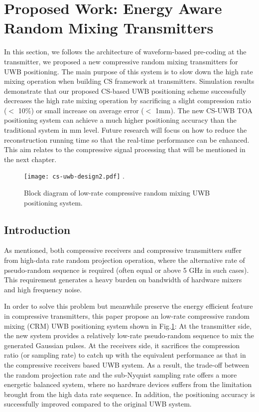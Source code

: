 \section{Proposed Work: Energy Aware Random Mixing Transmitters}

In this section, we follows the architecture of waveform-based pre-coding at the transmitter\cite{zhang2009compressed}, we proposed a new compressive random mixing transmitters for UWB positioning. The main purpose of this system is to slow down the high rate mixing operation when building CS framework at transmitters. Simulation results demonstrate that our proposed CS-based UWB positioning scheme successfully decreases the high rate mixing operation by sacrificing a slight compression ratio ($<$ 10\%) or small increase on average error ($<$ 1mm). The new CS-UWB TOA positioning system can achieve a much higher positioning accuracy than the traditional system in mm level. Future research will focus on how to reduce the reconstruction running time so that the real-time performance can be enhanced. This aim relates to the compressive signal processing that will be mentioned in the next chapter.

\begin{figure}[!t]
\centering
\texttt{[image: cs-uwb-design2.pdf]}
\DeclareGraphicsExtensions.
\caption{Block diagram of low-rate compressive random mixing UWB positioning system.}
\label{cs-uwb-design2}
\end{figure}

\subsection{Introduction}

As mentioned, both compressive receivers and compressive transmitters suffer from high-data rate random projection operation, where the alternative rate of pseudo-random sequence is required (often equal or above 5 GHz in such cases). This requirement generates a heavy burden on bandwidth of hardware mixers and high frequency noise. 

In order to solve this problem but meanwhile preserve the energy efficient feature in compressive transmitters, this paper propose an low-rate compressive random mixing (CRM) UWB positioning system shown in Fig.\ref{cs-uwb-design2}: At the transmitter side, the new system provides a relatively low-rate pseudo-random sequence to mix the generated Gaussian pulses. At the receivers side, it sacrifices the compression ratio (or sampling rate) to catch up with the equivalent performance as that in the compressive receivers based UWB system. As a result, the trade-off between the random projection rate and the sub-Nyquist sampling rate offers a more energetic balanced system, where no hardware devices suffers from the limitation brought from the high data rate sequence. In addition, the positioning accuracy is successfully improved compared to the original UWB system. 

